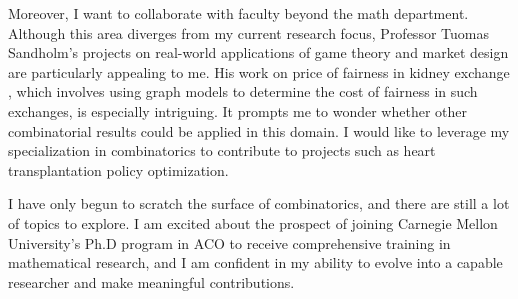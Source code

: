\documentclass[12pt]{article}
\begin{document}
Moreover, I want to collaborate with faculty beyond the math department. Although this area diverges
from my current research focus, Professor Tuomas Sandholm's projects on real-world applications of
game theory and market design are particularly appealing to me. His work on price of fairness in
kidney exchange \cite{dickerson2014price}, which involves using graph models to determine the cost
of fairness in such exchanges, is especially intriguing. It prompts me to wonder whether other
combinatorial results could be applied in this domain. I would like to leverage my specialization in
combinatorics to contribute to projects such as heart transplantation policy optimization.

I have only begun to scratch the surface of combinatorics, and there are still a lot of topics to
explore. I am excited about the prospect of joining Carnegie Mellon University's Ph.D program in ACO
to receive comprehensive training in mathematical research, and I am confident in my ability to
evolve into a capable researcher and make meaningful contributions.  

\newpage



\end{document}
